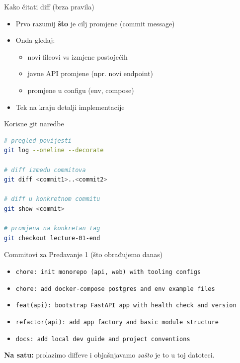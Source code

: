 \begin{frame}{Kako čitati diff (brza pravila)}
\begin{itemize}
  \item Prvo razumij \textbf{što} je cilj promjene (commit message)
  \item Onda gledaj:
  \begin{itemize}
    \item novi fileovi vs izmjene postojećih
    \item javne API promjene (npr. novi endpoint)
    \item promjene u configu (env, compose)
  \end{itemize}
  \item Tek na kraju detalji implementacije
\end{itemize}
\end{frame}

\begin{frame}[fragile,shrink=5]{Korisne git naredbe}
\begin{lstlisting}[language=bash]
# pregled povijesti
git log --oneline --decorate

# diff izmedu commitova
git diff <commit1>..<commit2>

# diff u konkretnom commitu
git show <commit>

# promjena na konkretan tag
git checkout lecture-01-end
\end{lstlisting}
\end{frame}

\begin{frame}{Commitovi za Predavanje 1 (što obrađujemo danas)}
\begin{itemize}
  \item \texttt{chore: init monorepo (api, web) with tooling configs}
  \item \texttt{chore: add docker-compose postgres and env example files}
  \item \texttt{feat(api): bootstrap FastAPI app with health check and version}
  \item \texttt{refactor(api): add app factory and basic module structure}
  \item \texttt{docs: add local dev guide and project conventions}
\end{itemize}

\vspace{0.6em}
\textbf{Na satu:} prolazimo diffeve i objašnjavamo \emph{zašto} je to u toj datoteci.
\end{frame}

